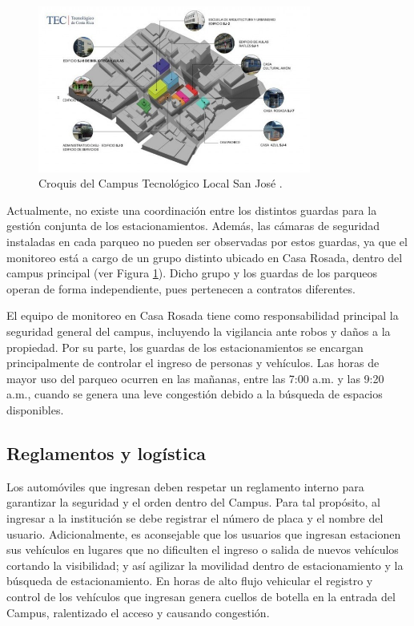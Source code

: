 \begin{figure}[H]
	\centering
	\includegraphics[width=0.8\textwidth]{fig/proy/croquis_del_campus_tec_san_jose.jpeg}
	\caption{Croquis del Campus Tecnológico Local San José \cite{tecCroquisSJ}.}
	\label{fig:croquis_tec}
\end{figure}

Actualmente, no existe una coordinación entre los distintos guardas para la gestión conjunta de los estacionamientos.
Además, las cámaras de seguridad instaladas en cada parqueo no pueden ser observadas por estos guardas,
ya que el monitoreo está a cargo de un grupo distinto ubicado en Casa Rosada,
dentro del campus principal (ver Figura \ref{fig:croquis_tec}).
Dicho grupo y los guardas de los parqueos operan de forma independiente, pues pertenecen a contratos diferentes.

El equipo de monitoreo en Casa Rosada tiene como responsabilidad principal la seguridad general del campus,
incluyendo la vigilancia ante robos y daños a la propiedad. Por su parte,
los guardas de los estacionamientos se encargan principalmente de controlar el ingreso de personas y vehículos.
Las horas de mayor uso del parqueo ocurren en las mañanas, entre las 7:00 a.m. y las 9:20 a.m.,
cuando se genera una leve congestión debido a la búsqueda de espacios disponibles.

\subsection{Reglamentos y logística}
Los automóviles que ingresan deben respetar un reglamento 
interno para garantizar la seguridad y el orden dentro del Campus.
Para tal propósito, al ingresar a la institución se debe registrar el número de placa y el nombre del usuario.
Adicionalmente, es aconsejable que los usuarios que ingresan estacionen sus vehículos
en lugares que no dificulten el ingreso o salida de nuevos vehículos cortando la visibilidad;
y así agilizar la movilidad dentro de estacionamiento y la búsqueda de estacionamiento.
En horas de alto flujo vehicular el registro y control de los vehículos que ingresan
genera cuellos de botella en la entrada del Campus, ralentizado el acceso y causando congestión.

